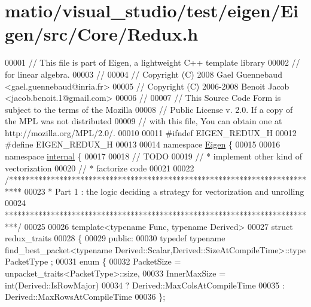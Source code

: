 \hypertarget{matio_2visual__studio_2test_2eigen_2_eigen_2src_2_core_2_redux_8h_source}{}\section{matio/visual\+\_\+studio/test/eigen/\+Eigen/src/\+Core/\+Redux.h}
\label{matio_2visual__studio_2test_2eigen_2_eigen_2src_2_core_2_redux_8h_source}

\begin{DoxyCode}
00001 \textcolor{comment}{// This file is part of Eigen, a lightweight C++ template library}
00002 \textcolor{comment}{// for linear algebra.}
00003 \textcolor{comment}{//}
00004 \textcolor{comment}{// Copyright (C) 2008 Gael Guennebaud <gael.guennebaud@inria.fr>}
00005 \textcolor{comment}{// Copyright (C) 2006-2008 Benoit Jacob <jacob.benoit.1@gmail.com>}
00006 \textcolor{comment}{//}
00007 \textcolor{comment}{// This Source Code Form is subject to the terms of the Mozilla}
00008 \textcolor{comment}{// Public License v. 2.0. If a copy of the MPL was not distributed}
00009 \textcolor{comment}{// with this file, You can obtain one at http://mozilla.org/MPL/2.0/.}
00010 
00011 \textcolor{preprocessor}{#ifndef EIGEN\_REDUX\_H}
00012 \textcolor{preprocessor}{#define EIGEN\_REDUX\_H}
00013 
00014 \textcolor{keyword}{namespace }\hyperlink{namespace_eigen}{Eigen} \{ 
00015 
00016 \textcolor{keyword}{namespace }\hyperlink{namespaceinternal}{internal} \{
00017 
00018 \textcolor{comment}{// TODO}
00019 \textcolor{comment}{//  * implement other kind of vectorization}
00020 \textcolor{comment}{//  * factorize code}
00021 
00022 \textcolor{comment}{/***************************************************************************}
00023 \textcolor{comment}{* Part 1 : the logic deciding a strategy for vectorization and unrolling}
00024 \textcolor{comment}{***************************************************************************/}
00025 
00026 \textcolor{keyword}{template}<\textcolor{keyword}{typename} Func, \textcolor{keyword}{typename} Derived>
00027 \textcolor{keyword}{struct }redux\_traits
00028 \{
00029 \textcolor{keyword}{public}:
00030     \textcolor{keyword}{typedef} \textcolor{keyword}{typename} find\_best\_packet<typename Derived::Scalar,Derived::SizeAtCompileTime>::type PacketType
      ;
00031   \textcolor{keyword}{enum} \{
00032     PacketSize = unpacket\_traits<PacketType>::size,
00033     InnerMaxSize = int(Derived::IsRowMajor)
00034                  ? Derived::MaxColsAtCompileTime
00035                  : Derived::MaxRowsAtCompileTime
00036   \};

\end{DoxyCode}
